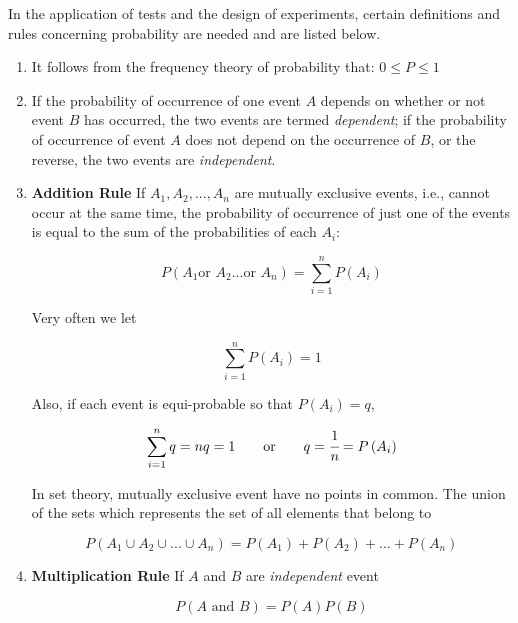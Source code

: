 \documentclass[../Parameter_fitting.tex]{subfiles}
\begin{document}
In the application of tests and the design of experiments, certain definitions and rules concerning probability are needed and are listed below.

\begin{enumerate}
	\item It follows from the frequency theory of probability that: $0 \leq P \leq 1$
	\item If the probability of occurrence of one event $A$ depends on whether or not event $B$ has occurred, the two events are termed \textit{dependent}; if the probability of occurrence of event $A$ does not depend on the occurrence of $B$, or the reverse, the two events are \textit{independent}.
	\item \textbf{Addition Rule}
	If $A_1,A_2,...,A_n$ are mutually exclusive events, i.e., cannot occur at the same time, the probability of occurrence of just one of the events is equal to the sum of the probabilities of each $A_i$:
	
	{\footnotesize
		\begin{equation}
			P\left( A_1 \text{or~} A_2... \text{or~} A_n \right) = \sum_{i=1}^{n} P\left( A_i \right)
	\end{equation} }
	
	Very often we let
	
	{\footnotesize
		\begin{equation}
			\sum_{i=1}^{n} P\left( A_i \right) = 1
	\end{equation} }
	
	Also, if each event is equi-probable so that $P(A_i) = q$,
	
	{\footnotesize
		\begin{equation}
			\sum_{i=1}^{n} q = nq = 1 \qquad \text{or} \qquad  q=\cfrac{1}{n} = P\left( A_i \right)
	\end{equation} }
	
	In set theory, mutually exclusive event have no points in common. The union of the sets which represents the set of all elements that belong to
	
	{\footnotesize
		\begin{equation}
			P\left( A_1 \cup A_2 \cup ... \cup A_n \right) = P(A_1) + P(A_2) + ... + P(A_n)
	\end{equation} }
	
	\item \textbf{Multiplication Rule}
	If $A$ and $B$ are \textit{independent} event
	
	{\footnotesize
		\begin{equation}
			P\left( A \text{~and~} B\right) = P(A)P(B)
	\end{equation} }
	

\end{enumerate}
\end{document}
